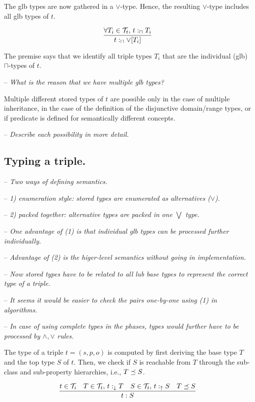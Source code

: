 \documentclass[runningheads]{llncs}
\newcommand{\darr}{\downarrow}
\newcommand{\uarr}{\uparrow}
\newcommand{\T}{{\cal T}}
\newcommand{\nl}{\hfill\break}
\newcommand{\notes}[1]{\noindent\begin{small}-- \emph{#1}\\\end{small}}
\begin{document}
The glb types are now gathered in a $\lor$-type. Hence, the resulting
$\lor$-type includes all glb types of $t$.

\begin{equation}
\dfrac{\forall\/T_i\in\T_t,\, t:_\sqcap\/T_i}
      {t:_\sqcap\lor[T_i]}
\end{equation}

The premise says that we identify all triple types $T_i$ that
are the individual (glb) $\sqcap$-types of $t$. 

\medskip
\notes{What is the reason that we have multiple glb types?}

Multiple different stored types of $t$ are possible only in
the case of multiple inheritance, in the case of the definition of the
disjunctive domain/range types, or if predicate is defined for
semantically different concepts.

\notes{Describe each possibility in more detail.}





\subsection{Typing a triple.}\nl

\notes{Two ways of defining semantics.}
\notes{1) enumeration style: stored types are enumerated as alternatives ($\lor$).}
\notes{2) packed together: alternative types are packed in one $\bigvee$ type.}
\notes{One advantage of (1) is that individual glb types can be processed further individually.}
\notes{Advantage of (2) is the higer-level semantics without going in implementation.}

\notes{Now stored types have to be related to all lub base types to represent the correct type of a triple.}
\notes{It seems it would be easier to check the pairs one-by-one using (1) in algorithms.}
\notes{In case of using complete types in the phases, types would further have to be processed by $\land,\lor$ rules.}

The type of a triple $t=(s,p,o)$ is computed by first deriving the
base type $T$ and the top type $S$ of $t$. Then, we check if $S$ is
reachable from $T$ through the sub-class and sub-property hierarchies,
i.e., $T\preceq\/S$.

\begin{equation}
\dfrac{t\in\T_i\quad T\in\T_t,\, t:_{\darr}T\quad S\in\T_t,\, t:_\uarr\/S\quad T\preceq\/S}
      {t:S}
\end{equation}
\end{document}
